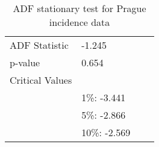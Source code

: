 \begin{table}
\begin{tabularx}{\textwidth}{lllX}
\toprule
\midrule
ADF Statistic & -1.245 \\
p-value & 0.654 \\
Critical Values &  \\
 & 1\%: -3.441 \\
 & 5\%: -2.866 \\
 & 10\%: -2.569 \\
\bottomrule
\end{tabularx}
\caption{ADF stationary test for Prague incidence data}
\label{tab:adf_test_prague}
\end{table}
